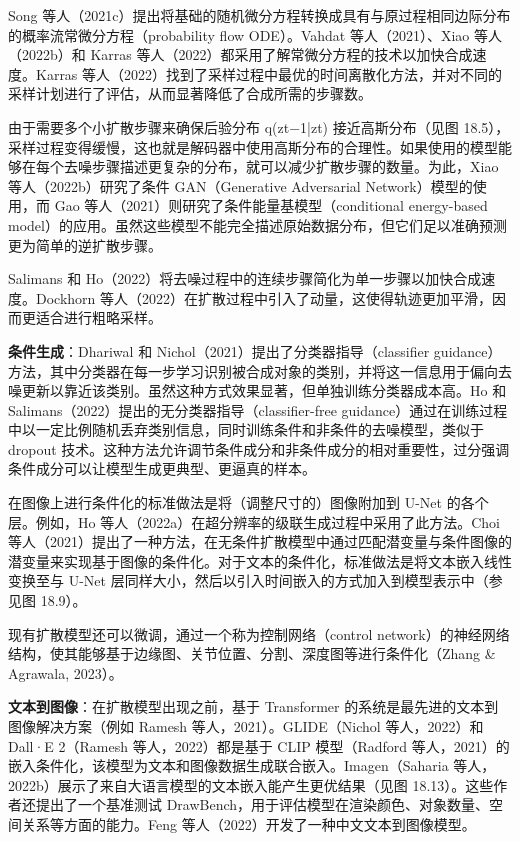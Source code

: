 Song 等人（2021c）提出将基础的随机微分方程转换成具有与原过程相同边际分布的概率流常微分方程（probability flow ODE）。Vahdat 等人（2021）、Xiao 等人（2022b）和 Karras 等人（2022）都采用了解常微分方程的技术以加快合成速度。Karras 等人（2022）找到了采样过程中最优的时间离散化方法，并对不同的采样计划进行了评估，从而显著降低了合成所需的步骤数。

由于需要多个小扩散步骤来确保后验分布 q(zt−1|zt) 接近高斯分布（见图 18.5），采样过程变得缓慢，这也就是解码器中使用高斯分布的合理性。如果使用的模型能够在每个去噪步骤描述更复杂的分布，就可以减少扩散步骤的数量。为此，Xiao 等人（2022b）研究了条件 GAN（Generative Adversarial Network）模型的使用，而 Gao 等人（2021）则研究了条件能量基模型（conditional energy-based model）的应用。虽然这些模型不能完全描述原始数据分布，但它们足以准确预测更为简单的逆扩散步骤。

Salimans 和 Ho（2022）将去噪过程中的连续步骤简化为单一步骤以加快合成速度。Dockhorn 等人（2022）在扩散过程中引入了动量，这使得轨迹更加平滑，因而更适合进行粗略采样。

\textbf{条件生成}：Dhariwal 和 Nichol（2021）提出了分类器指导（classifier guidance）方法，其中分类器在每一步学习识别被合成对象的类别，并将这一信息用于偏向去噪更新以靠近该类别。虽然这种方式效果显著，但单独训练分类器成本高。Ho 和 Salimans（2022）提出的无分类器指导（classifier-free guidance）通过在训练过程中以一定比例随机丢弃类别信息，同时训练条件和非条件的去噪模型，类似于 dropout 技术。这种方法允许调节条件成分和非条件成分的相对重要性，过分强调条件成分可以让模型生成更典型、更逼真的样本。

在图像上进行条件化的标准做法是将（调整尺寸的）图像附加到 U-Net 的各个层。例如，Ho 等人（2022a）在超分辨率的级联生成过程中采用了此方法。Choi 等人（2021）提出了一种方法，在无条件扩散模型中通过匹配潜变量与条件图像的潜变量来实现基于图像的条件化。对于文本的条件化，标准做法是将文本嵌入线性变换至与 U-Net 层同样大小，然后以引入时间嵌入的方式加入到模型表示中（参见图 18.9）。

现有扩散模型还可以微调，通过一个称为控制网络（control network）的神经网络结构，使其能够基于边缘图、关节位置、分割、深度图等进行条件化（Zhang & Agrawala, 2023）。

\textbf{文本到图像}：在扩散模型出现之前，基于 Transformer 的系统是最先进的文本到图像解决方案（例如 Ramesh 等人，2021）。GLIDE（Nichol 等人，2022）和 Dall·E 2（Ramesh 等人，2022）都是基于 CLIP 模型（Radford 等人，2021）的嵌入条件化，该模型为文本和图像数据生成联合嵌入。Imagen（Saharia 等人，2022b）展示了来自大语言模型的文本嵌入能产生更优结果（见图 18.13）。这些作者还提出了一个基准测试 DrawBench，用于评估模型在渲染颜色、对象数量、空间关系等方面的能力。Feng 等人（2022）开发了一种中文文本到图像模型。

